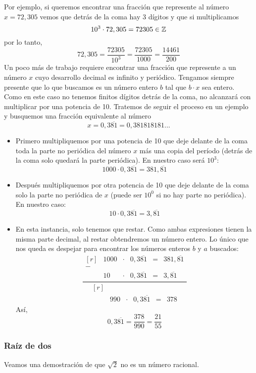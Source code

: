 \documentclass[../teoria.root.tex]{subfiles}
\begin{document}
Por ejemplo, si queremos encontrar una fracción que represente al número \(x = 72,305\) vemos que detrás de la coma hay 3 dígitos y que si multiplicamos
\[10^3\cdot72,305=72305\in\mathbb{Z}\] por lo tanto, \[72,305=\frac{72305}{10^3}=\frac{72305}{1000}=\frac{14461}{200}\]
Un poco más de trabajo requiere encontrar una fracción que represente a un número \(x\) cuyo desarrollo decimal es infinito y periódico.
Tengamos siempre presente que lo que buscamos es un número entero \(b\) tal que \(b \cdot x\) sea entero.
Como en este caso no tenemos finitos dígitos detrás de la coma, no alcanzará con multiplicar por una potencia de 10.
Tratemos de seguir el proceso en un ejemplo y busquemos una fracción equivalente al número \[x=0,3\overline{81}=0,381818181...\]
\begin{itemize}
	\item Primero multipliquemos por una potencia de 10 que deje delante de la coma toda la parte no periódica del número \(x\) más una copia del período (detrás de la coma solo quedará la parte periódica).
	      En nuestro caso será \(10^3\):\[1000\cdot0,3\overline{81}=381,\overline{81}\]
	\item Después multipliquemos por otra potencia de 10 que deje delante de la coma solo la parte no periódica de \(x\) (puede ser \(10^0\) si no hay parte no periódica).
	      En nuestro caso:\[10\cdot0,3\overline{81}=3,\overline{81}\]
	\item En esta instancia, solo tenemos que restar.
	      Como ambas expresiones tienen la misma parte decimal, al restar obtendremos un número entero.
	      Lo único que nos queda es despejar para encontrar los números enteros \(b\) y \(a\) buscados:
	      {
	      \def\arraystretch{1}
	      \[\frac{
			      \begin{matrix*}[r]
				      & 1000 & \cdot & 0,3\overline{81} & = & 381,\overline{81}\\
				      -\\
				      & 10 & \cdot & 0,3\overline{81} & = & 3,\overline{81}
			      \end{matrix*}
		      }{
			      \begin{matrix*}[r]
				      \\
				      & 990 & \cdot & 0,3\overline{81} & = & 378
			      \end{matrix*}
		      }\]
	      }
	      Así, \[0,3\overline{81}=\frac{378}{990}=\frac{21}{55}\]
\end{itemize}
\subsubsection{Raíz de dos}
Veamos una demostración de que \(\sqrt{2}\) no es un número racional.
\end{document}
